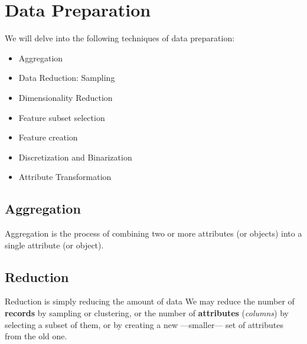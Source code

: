 \section{Data Preparation}
We will delve into the following techniques of data preparation:
\begin{itemize}
	\item Aggregation
	\item Data Reduction: Sampling
	\item Dimensionality Reduction
	\item Feature subset selection
	\item Feature creation
	\item Discretization and Binarization
	\item Attribute Transformation
\end{itemize}

\subsection{Aggregation}
Aggregation is the process of combining two or more attributes (or objects) into a single attribute (or object).

\subsection{Reduction}
Reduction is simply reducing the amount of data
We may reduce the number of \textbf{records} by sampling or clustering, or the number of \textbf{attributes} (\textit{columns}) by selecting a subset of them, or by creating a new ---smaller--- set of attributes from the old one.

